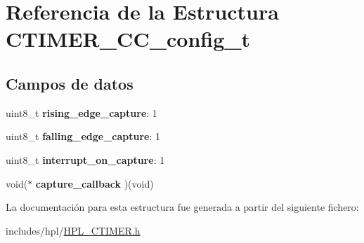 \hypertarget{structCTIMER__CC__config__t}{}\section{Referencia de la Estructura C\+T\+I\+M\+E\+R\+\_\+\+C\+C\+\_\+config\+\_\+t}
\label{structCTIMER__CC__config__t}
\subsection*{Campos de datos}
\begin{DoxyCompactItemize}
\item 
\mbox{\label{structCTIMER__CC__config__t_a0a1664790b7342e9ead85f048887b1c1}} 
uint8\+\_\+t {\bfseries rising\+\_\+edge\+\_\+capture}\+: 1
\item 
\mbox{\label{structCTIMER__CC__config__t_a1b2852c74c6b61a0beee13cdffa65b62}} 
uint8\+\_\+t {\bfseries falling\+\_\+edge\+\_\+capture}\+: 1
\item 
\mbox{\label{structCTIMER__CC__config__t_a277f2c1e8f9835197d36162fe83639eb}} 
uint8\+\_\+t {\bfseries interrupt\+\_\+on\+\_\+capture}\+: 1
\item 
\mbox{\label{structCTIMER__CC__config__t_ab7d24f742a507abc3145c598535317b8}} 
void($\ast$ {\bfseries capture\+\_\+callback} )(void)
\end{DoxyCompactItemize}


La documentación para esta estructura fue generada a partir del siguiente fichero\+:\begin{DoxyCompactItemize}
\item 
includes/hpl/\hyperlink{HPL__CTIMER_8h}{H\+P\+L\+\_\+\+C\+T\+I\+M\+E\+R.\+h}\end{DoxyCompactItemize}
